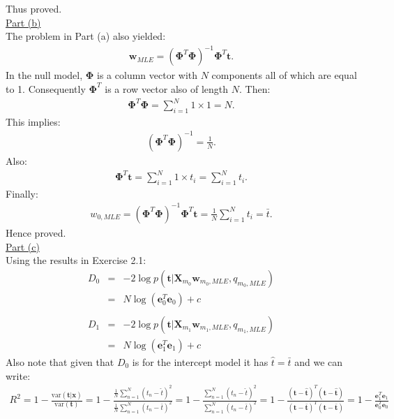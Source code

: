 \documentclass[a4paper, 11pt]{article}
\begin{document}
Thus proved.\\
\newline \underline{Part (b)}\\
\newline The problem in Part (a) also yielded:
\begin{eqnarray}
\mathbf{w}_{MLE} = \left( \mathbf{\Phi}^T \mathbf{\Phi} \right)^{-1} \mathbf{\Phi}^T \mathbf{t}. \nonumber
\end{eqnarray}
In the null model, $\mathbf{\Phi}$ is a column vector with $N$ components all of which are equal to 1. Consequently $\mathbf{\Phi}^T$ is a row vector also of length $N$. Then:
\begin{eqnarray}
\mathbf{\Phi}^T \mathbf{\Phi} = \sum_{i=1}^{N} 1 \times 1 = N. \nonumber
\end{eqnarray}
This implies:
\begin{eqnarray}
\left( \mathbf{\Phi}^T \mathbf{\Phi} \right)^{-1} = \frac{1}{N}. \nonumber
\end{eqnarray}
Also:
\begin{eqnarray}
\mathbf{\Phi}^T \mathbf{t} = \sum_{i=1}^{N} 1 \times t_i = \sum_{i=1}^{N} t_i. \nonumber
\end{eqnarray}
Finally:
\begin{eqnarray}
w_{0, MLE} = \left( \mathbf{\Phi}^T \mathbf{\Phi} \right)^{-1} \mathbf{\Phi}^T \mathbf{t} = \frac{1}{N} \sum_{i=1}^{N} t_i = \bar{t}. \nonumber
\end{eqnarray}
Hence proved.\\
\newline \underline{Part (c)}\\
\newline Using the results in Exercise 2.1:
\begin{eqnarray}
D_0 &=& -2 \log p(\mathbf{t} | \mathbf{X}_{m_0} \mathbf{w}_{m_0, MLE}, q_{m_0, MLE})  \nonumber \\
&=& N \log (\mathbf{e}_{0}^{T} \mathbf{e}_{0}) + c \nonumber \\
\nonumber \\
D_1 &=& -2 \log p(\mathbf{t} | \mathbf{X}_{m_1} \mathbf{w}_{m_1, MLE}, q_{m_1, MLE})  \nonumber \\
&=& N \log (\mathbf{e}_{1}^{T} \mathbf{e}_{1}) + c \nonumber
\end{eqnarray}
Also note that given that $D_0$ is for the intercept model it has $\hat{t} = \bar{t}$ and we can write:
\begin{eqnarray}
R^2 = 1 - \frac{\text{var}(\mathbf{t} | \mathbf{x}) }{\text{var}(\mathbf{t})} = 1 - \frac{\frac{1}{N} \sum_{n=1}^{N} (t_n - \hat{t})^2 }{\frac{1}{N} \sum_{n=1}^{N} (t_n - \bar{t})^2} = 1 - \frac{\sum_{n=1}^{N} (t_n - \hat{t})^2 }{\sum_{n=1}^{N} (t_n - \bar{t})^2} = 1 - \frac{(\mathbf{t} - \hat{\mathbf{t}})^T (\mathbf{t} - \hat{\mathbf{t}})}{(\mathbf{t} - \bar{\mathbf{t}})^T (\mathbf{t} - \bar{\mathbf{t}})} = 1 - \frac{\mathbf{e}_{1}^{T} \mathbf{e}_{1}}{\mathbf{e}_{0}^{T} \mathbf{e}_{0}}  \nonumber
\end{eqnarray}
\end{document}

